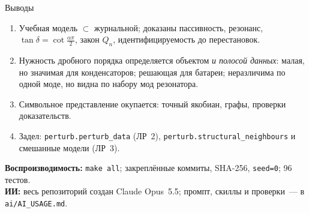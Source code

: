 \documentclass[aspectratio=169,11pt]{beamer}
\begin{document}
\begin{frame}{Выводы}
  \small
  \begin{enumerate}
    \item Учебная модель $\subset$ журнальной; доказаны пассивность, резонанс, $\tan\delta=\cot\frac{\alpha\pi}{2}$, закон $Q_n$, идентифицируемость до перестановок.
    \item Нужность дробного порядка определяется объектом \emph{и полосой данных}: малая, но значимая для конденсаторов; решающая для батареи; неразличима по одной моде, но видна по набору мод резонатора.
    \item Символьное представление окупается: точный якобиан, графы, проверки доказательств.
    \item Задел: \texttt{perturb.perturb\_data} (ЛР~2), \texttt{perturb.structural\_neighbours} и смешанные модели (ЛР~3).
  \end{enumerate}
  \medskip
  \textbf{Воспроизводимость:} \texttt{make all}; закреплённые коммиты, SHA-256, \texttt{seed=0}; 96 тестов.\\
  \textbf{ИИ:} весь репозиторий создан Claude Opus~5.5; промпт, скиллы и проверки~--- в \texttt{ai/AI\_USAGE.md}.
\end{frame}
\end{document}
